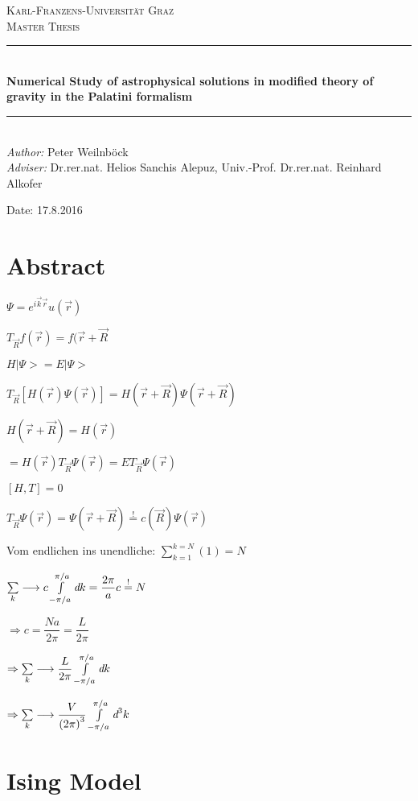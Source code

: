 \documentclass[a4paper]{article}
\title{\Title}
\author{\Author}
\date{\Date}
\newcommand{\HRule}{\rule{\linewidth}{0.2mm}}
\newcommand{\Title}{Numerical Study of astrophysical solutions in modified theory of gravity in the Palatini formalism}
\newcommand{\Date}{17.8.2016}
\begin{document}
\begin{titlepage}
\begin{center} 
\textsc{\large Karl-Franzens-Universität Graz}\\[3.0cm]

\textsc{\LARGE Master Thesis}\\[1.0cm]
\HRule \\[0.5cm]
{ \Huge \bfseries \Title}\\[0.2cm]
\HRule \\[1.5cm]
\emph{Author:}
Peter Weilnböck\\[0.5cm]
\emph{Adviser: }Dr.rer.nat. Helios Sanchis Alepuz, Univ.-Prof. Dr.rer.nat. Reinhard Alkofer

\vfill
{\LARGE Date: \Date}
\end{center}
\end{titlepage}

\pagebreak

\tableofcontents
\pagebreak

\section*{Abstract}
$\Psi=e^{i \overrightarrow{k} \overrightarrow{r}} u\left( \overrightarrow{r }\right)$

$T_{\overrightarrow{R}} f(\overrightarrow{r})=f(\overrightarrow{r}+\overrightarrow{R} $

$H |\Psi> = E |\Psi> $

$T_{\overrightarrow{R}}\left[ H(\overrightarrow{r})\Psi(\overrightarrow{r})\right] = H(\overrightarrow{r} + \overrightarrow{R})\Psi(\overrightarrow{r} + \overrightarrow{R})$

$H(\overrightarrow{r} + \overrightarrow{R})= H(\overrightarrow{r})$

$=H(\overrightarrow{r})T_{\overrightarrow{R}}\Psi(\overrightarrow{r})=E T_{\overrightarrow{R}}\Psi(\overrightarrow{r})$

$\left[H , T\right] = 0$

$T_{\overrightarrow{R}}\Psi(\overrightarrow{r}) =  \Psi(\overrightarrow{r} + \overrightarrow{R}) \overset{!}{=} c(\overrightarrow{R}) \Psi(\overrightarrow{r})$

Vom endlichen ins unendliche:
$\sum\limits^{k=N}_{k=1}(1)=N $

$\sum\limits_k \longrightarrow c \int\limits_{-\pi/a}^{\pi/a} \emph{d}k = \dfrac{2 \pi}{a} c \overset{!}{=} N$

$\Rightarrow c = \dfrac{N a}{2 \pi} = \dfrac{L}{2\pi} $ 

$\Rightarrow \sum\limits_k \longrightarrow \dfrac{L}{2\pi} \int\limits_{-\pi/a}^{\pi/a} \emph{d}k$
 
$\Rightarrow \sum\limits_k \longrightarrow \dfrac{V}{\left(2\pi\right)^{3}} \int\limits_{-\pi/a}^{\pi/a} \emph{d}^3k$
 
\section{Ising Model}


\nocite{*}

\end{document}
